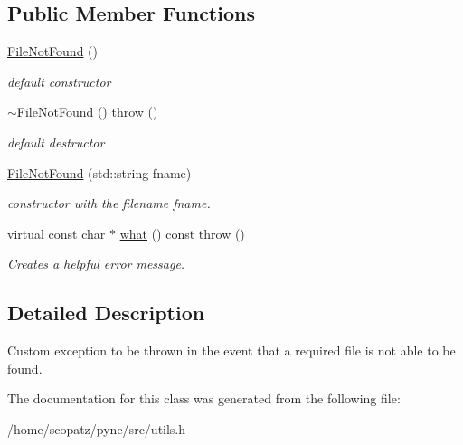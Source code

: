 \subsection*{Public Member Functions}
\begin{DoxyCompactItemize}
\item 
\hypertarget{classpyne_1_1_file_not_found_aaae1bdf04df2b68377ae453929c8eb56}{\hyperlink{classpyne_1_1_file_not_found_aaae1bdf04df2b68377ae453929c8eb56}{File\-Not\-Found} ()}\label{classpyne_1_1_file_not_found_aaae1bdf04df2b68377ae453929c8eb56}

\begin{DoxyCompactList}\small\item\em default constructor \end{DoxyCompactList}\item 
\hypertarget{classpyne_1_1_file_not_found_abc00e9c8711bb1b1bb2dc1dfd3a98745}{\hyperlink{classpyne_1_1_file_not_found_abc00e9c8711bb1b1bb2dc1dfd3a98745}{$\sim$\-File\-Not\-Found} ()  throw ()}\label{classpyne_1_1_file_not_found_abc00e9c8711bb1b1bb2dc1dfd3a98745}

\begin{DoxyCompactList}\small\item\em default destructor \end{DoxyCompactList}\item 
\hypertarget{classpyne_1_1_file_not_found_a4d766115c01634b77aebe42269f9aead}{\hyperlink{classpyne_1_1_file_not_found_a4d766115c01634b77aebe42269f9aead}{File\-Not\-Found} (std\-::string fname)}\label{classpyne_1_1_file_not_found_a4d766115c01634b77aebe42269f9aead}

\begin{DoxyCompactList}\small\item\em constructor with the filename {\itshape fname}. \end{DoxyCompactList}\item 
\hypertarget{classpyne_1_1_file_not_found_a55d410139d5853e8988d073637845cbd}{virtual const char $\ast$ \hyperlink{classpyne_1_1_file_not_found_a55d410139d5853e8988d073637845cbd}{what} () const   throw ()}\label{classpyne_1_1_file_not_found_a55d410139d5853e8988d073637845cbd}

\begin{DoxyCompactList}\small\item\em Creates a helpful error message. \end{DoxyCompactList}\end{DoxyCompactItemize}


\subsection{Detailed Description}
Custom exception to be thrown in the event that a required file is not able to be found. 

The documentation for this class was generated from the following file\-:\begin{DoxyCompactItemize}
\item 
/home/scopatz/pyne/src/utils.\-h\end{DoxyCompactItemize}

